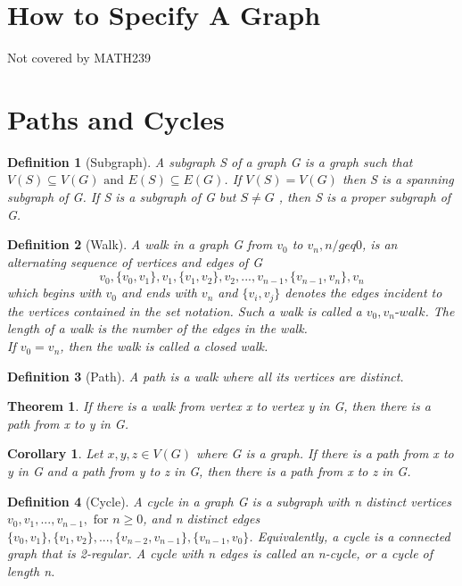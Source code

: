 \documentclass[11pt, oneside]{book}
\theoremstyle{break}
\newtheorem{thm}{Theorem}[section]
\newtheorem{crly}{Corollary}[thm]
\newtheorem{defn}{Definition}[section]
\begin{document}
\section{How to Specify A Graph}
Not covered by MATH239


\section{Paths and Cycles}

\begin{defn}[Subgraph]
	A subgraph S of a graph G is a graph such that $V(S) \subseteq V(G) \text{ and } E(S) \subseteq E(G)$. If $V(S) = V(G)$ then S is a spanning subgraph of G. If S is a subgraph of G but $S \neq G$ , then S is a proper subgraph of G.
\end{defn}

\begin{defn}[Walk]
	A walk in a graph G from $v_0$ to $v_n, n /geq 0$, is an alternating sequence of vertices and edges of G
	\[
		v_0, \{v_0, v_1\}, v_1, \{v_1, v_2\}, v_2, ..., v_{n-1}, \{v_{n-1}, v_n\}, v_n
	\]
	which begins with $v_0$ and ends with $v_n$ and $\{v_i, v_j\}$ denotes the edges incident to the vertices contained in the set notation. Such a walk is called a $v_0, v_n \text{-} walk$. The length of a walk is the number of the edges in the walk. \\
	If $v_0 = v_n$, then the walk is called a closed walk.
\end{defn}

\begin{defn}[Path]
	A path is a walk where all its vertices are distinct.
\end{defn}

\begin{thm}
	If there is a walk from vertex x to vertex y in G, then there is a path from x to y in G.
\end{thm}

\begin{crly}
	Let $x, y, z \in V(G)$ where G is a graph. If there is a path from x to y in G and a path from y to z in G, then there is a path from x to z in G.
\end{crly}

\begin{defn}[Cycle]
	A cycle in a graph G is a subgraph with n distinct vertices $v_0, v_1, ..., v_{n-1}, \text{ for } n \geq 0$, and n distinct edges $\{v_0, v_1\}, \{v_1, v_2\}, ..., \{v_{n-2}, v_{n-1}\}, \{v_{n-1}, v_0\}$. Equivalently, a cycle is a connected graph that is 2-regular. A cycle with n edges is called an n-cycle, or a cycle of length n.
\end{defn}
\end{document}
